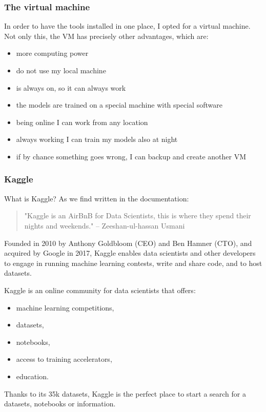 \subsubsection{The \gls{virtual machine}}
In order to have the tools installed in one place, I opted for a virtual machine.
Not only this, the VM has precisely other advantages, which are:
\begin{itemize}
    \item more computing power
    \item do not use my local machine 
    \item is always on, so it can always work
    \item the models are trained on a special machine with special software
    \item being online I can work from any location
    \item always working I can train my models also at night
    \item if by chance something goes wrong, I can backup and create another VM
\end{itemize}

\subsubsection{Kaggle}
What is Kaggle? 
As we find written in the documentation: 
\begin{quote}
    "Kaggle is an AirBnB for Data Scientists, this is where they spend their nights and weekends." – Zeeshan-ul-hassan Usmani
\end{quote}
Founded in 2010 by Anthony Goldbloom (CEO) and Ben Hamner (CTO), and acquired by Google in 2017, Kaggle enables data scientists and other developers to engage in running machine learning contests, write and share code, and to host datasets. 

Kaggle is an online community for data scientists that offers:
\begin{itemize}
    \item machine learning competitions,
    \item datasets,
    \item notebooks,
    \item access to training accelerators,
    \item education.
\end{itemize}
Thanks to its 35k datasets, Kaggle is the perfect place to start a search for a datasets, notebooks or information.

